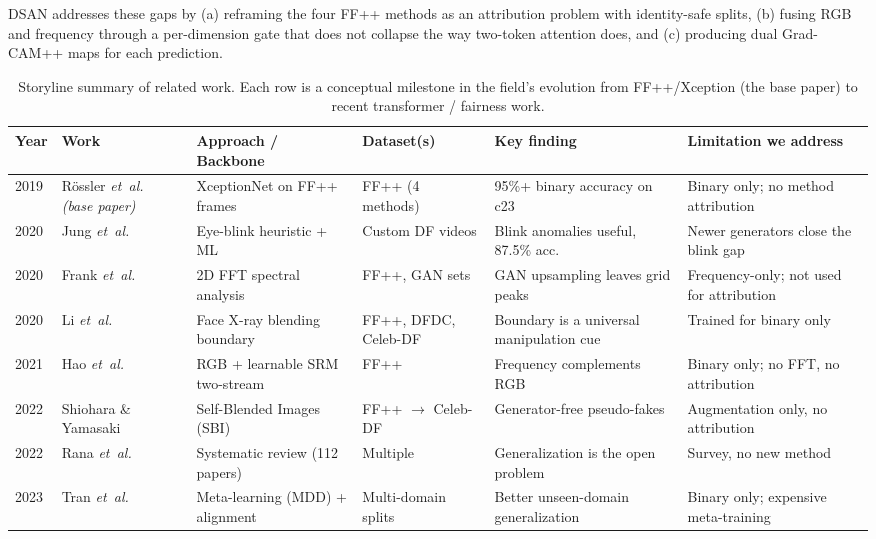 DSAN addresses these gaps by (a) reframing the four FF++ methods as an attribution problem with identity-safe splits, (b) fusing RGB and frequency through a per-dimension gate that does not collapse the way two-token attention does, and (c) producing dual Grad-CAM++ maps for each prediction.

\begin{table}[!t]
\centering
\caption{Storyline summary of related work. Each row is a conceptual milestone in the field's evolution from FF++/Xception (the base paper) to recent transformer / fairness work.}
\label{tab:related_summary}
\renewcommand{\arraystretch}{1.2}
\footnotesize
\begin{tabular}{@{}p{0.6cm} p{2.6cm} p{3.7cm} p{2.6cm} p{2.9cm} p{3.4cm}@{}}
\toprule
\textbf{Year} & \textbf{Work} & \textbf{Approach / Backbone} & \textbf{Dataset(s)} & \textbf{Key finding} & \textbf{Limitation we address} \\
\midrule
2019 & R\"ossler \textit{et~al.}~\cite{rossler2019faceforensics} \textit{(base paper)} & XceptionNet on FF++ frames & FF++ (4 methods) & 95\%+ binary accuracy on c23 & Binary only; no method attribution \\
2020 & Jung \textit{et~al.}~\cite{jung2020deepvision} & Eye-blink heuristic + ML & Custom DF videos & Blink anomalies useful, 87.5\% acc. & Newer generators close the blink gap \\
2020 & Frank \textit{et~al.}~\cite{frank2020leveraging} & 2D FFT spectral analysis & FF++, GAN sets & GAN upsampling leaves grid peaks & Frequency-only; not used for attribution \\
2020 & Li \textit{et~al.}~\cite{li2020facexray} & Face X-ray blending boundary & FF++, DFDC, Celeb-DF & Boundary is a universal manipulation cue & Trained for binary only \\
2021 & Hao \textit{et~al.}~\cite{hao2021twostreamSRM} & RGB + learnable SRM two-stream & FF++ & Frequency complements RGB & Binary only; no FFT, no attribution \\
2022 & Shiohara \& Yamasaki~\cite{shiohara2022sbi} & Self-Blended Images (SBI) & FF++ $\to$ Celeb-DF & Generator-free pseudo-fakes & Augmentation only, no attribution \\
2022 & Rana \textit{et~al.}~\cite{rana2022slr} & Systematic review (112 papers) & Multiple & Generalization is the open problem & Survey, no new method \\
2023 & Tran \textit{et~al.}~\cite{tran2023metadeepfake} & Meta-learning (MDD) + alignment & Multi-domain splits & Better unseen-domain generalization & Binary only; expensive meta-training \\

\end{tabular}
\end{table}

